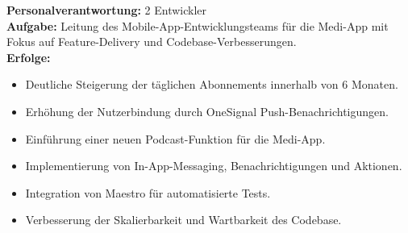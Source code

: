 \documentclass[10pt,a4paper,normalphoto]{altacv}
\begin{document}








\begin{fullwidth}
\makecvheader
\end{fullwidth}



\textbf{Personalverantwortung:} 2 Entwickler \\
\textbf{Aufgabe:} Leitung des Mobile-App-Entwicklungsteams für die Medi-App mit Fokus auf Feature-Delivery und Codebase-Verbesserungen.\\
\textbf{Erfolge:}
\begin{itemize}
    \item Deutliche Steigerung der täglichen Abonnements innerhalb von 6 Monaten.
    \item Erhöhung der Nutzerbindung durch OneSignal Push-Benachrichtigungen.
    \item Einführung einer neuen Podcast-Funktion für die Medi-App.
    \item Implementierung von In-App-Messaging, Benachrichtigungen und Aktionen.
    \item Integration von Maestro für automatisierte Tests.
    \item Verbesserung der Skalierbarkeit und Wartbarkeit des Codebase.
\end{itemize}
\end{document}
